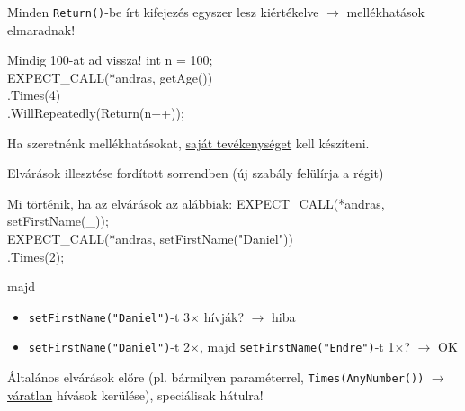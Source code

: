\documentclass[usenames,dvipsnames,aspectratio=169]{beamer}
\newcommand{\hiv}[1]{{\color{hivatkozasszin}#1}}
\begin{document}
\begin{frame}{}
    Minden \texttt{Return()}-be írt kifejezés egyszer lesz kiértékelve $\to$ mellékhatások elmaradnak!
    \begin{exampleblock}{Mindig 100-at ad vissza!}
        int n = 100;\\
        EXPECT\_CALL(*andras, getAge())\\
        \qquad .Times(4)\\
        \qquad .WillRepeatedly(Return(n++));\\
    \end{exampleblock}
    Ha szeretnénk mellékhatásokat, \hiv{\href{https://google.github.io/googletest/gmock\_cook\_book.html\#MockingSideEffects}{saját tevékenységet}} kell készíteni.
\end{frame}

\begin{frame}
    Elvárások illesztése fordított sorrendben (új szabály felülírja a régit)
    \begin{exampleblock}{Mi történik, ha az elvárások az alábbiak:}
        EXPECT\_CALL(*andras, setFirstName(\_));\\
        EXPECT\_CALL(*andras, setFirstName("Daniel"))\\
        \qquad .Times(2);
    \end{exampleblock}
    majd
    \begin{itemize}
        \item \texttt{setFirstName("Daniel")}-t 3$\times$ hívják? $\to$ hiba
        \item \texttt{setFirstName("Daniel")}-t 2$\times$, majd \texttt{setFirstName("Endre")}-t 1$\times$? $\to$ OK
    \end{itemize}
    Általános elvárások előre (pl. bármilyen paraméterrel, \texttt{Times(AnyNumber())} $\to$ \hiv{\href{https://google.github.io/googletest/gmock\_cook\_book.html\#uninteresting-vs-unexpected}{váratlan}} hívások kerülése), speciálisak hátulra!
\end{frame}
\end{document}
